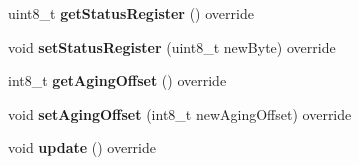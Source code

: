 \begin{DoxyCompactItemize}
\mbox{\label{class_d_s3231_aee77c6ecb3c292d375eebe7e58ebb024}} 
uint8\+\_\+t {\bfseries get\+Status\+Register} () override
\item 
\mbox{\label{class_d_s3231_a303a9a5123f66987e209396d60e329e8}} 
void {\bfseries set\+Status\+Register} (uint8\+\_\+t new\+Byte) override
\item 
\mbox{\label{class_d_s3231_a94e9f40f1b453dc4d8894b63bc0ec7d6}} 
int8\+\_\+t {\bfseries get\+Aging\+Offset} () override
\item 
\mbox{\label{class_d_s3231_a0a9dc2668139654b261c2feeb1d6e663}} 
void {\bfseries set\+Aging\+Offset} (int8\+\_\+t new\+Aging\+Offset) override
\item 
\mbox{\label{class_d_s3231_a143ec57122d892ea0ec671a153352f2c}} 
void {\bfseries update} () override
\end{DoxyCompactItemize}

